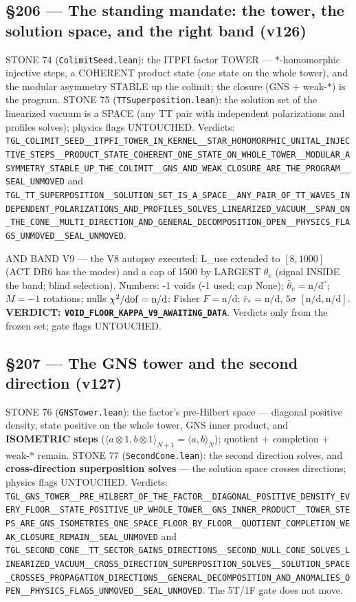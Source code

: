 \documentclass[11pt]{article}
\theoremstyle{definition}\newtheorem{deriv}{Derivation}
\begin{document}
\subsection*{\S206 --- The standing mandate: the tower, the solution space, and the right band (v126)}STONE 74 (\texttt{ColimitSeed.lean}): the ITPFI factor TOWER — *-homomorphic injective steps, a COHERENT product state (one state on the whole tower), and the modular asymmetry STABLE up the colimit; the closure (GNS $+$ weak-$*$) is the program. STONE 75 (\texttt{TTSuperposition.lean}): the solution set of the linearized vacuum is a SPACE (any TT pair with independent polarizations and profiles solves); physics flags UNTOUCHED. Verdicts: \texttt{TGL\_COLIMIT\_SEED\_\_ITPFI\_TOWER\_IN\_KERNEL\_\_STAR\_HOMOMORPHIC\_UNITAL\_INJECTIVE\_STEPS\_\_PRODUCT\_STATE\_COHERENT\_ONE\_STATE\_ON\_WHOLE\_TOWER\_\_MODULAR\_ASYMMETRY\_STABLE\_UP\_THE\_COLIMIT\_\_GNS\_AND\_WEAK\_CLOSURE\_ARE\_THE\_PROGRAM\_\_SEAL\_UNMOVED} and \texttt{TGL\_TT\_SUPERPOSITION\_\_SOLUTION\_SET\_IS\_A\_SPACE\_\_ANY\_PAIR\_OF\_TT\_WAVES\_INDEPENDENT\_POLARIZATIONS\_AND\_PROFILES\_SOLVES\_LINEARIZED\_VACUUM\_\_SPAN\_ON\_THE\_CONE\_\_MULTI\_DIRECTION\_AND\_GENERAL\_DECOMPOSITION\_OPEN\_\_PHYSICS\_FLAGS\_UNMOVED\_\_SEAL\_UNMOVED}.

AND BAND V9 — the V8 autopsy executed: L\_use extended to $[8,1000]$ (ACT DR6 has the modes) and a cap of 1500 by LARGEST $\theta_v$ (signal INSIDE the band; blind selection). Numbers: -1 voids (-1 used; cap None); $\bar\theta_v=\text{n/d}^{\circ}$; $M=-1$ rotations; nulls $\chi^2/{\rm dof}=\text{n/d}$; Fisher $F=\text{n/d}$; $\hat r_*=\text{n/d}$, $5\sigma$ $[\text{n/d},\text{n/d}]$. \textbf{VERDICT: \texttt{VOID\_FLOOR\_KAPPA\_V9\_AWAITING\_DATA}}. Verdicts only from the frozen set; gate flags UNTOUCHED.

\subsection*{\S207 --- The GNS tower and the second direction (v127)}STONE 76 (\texttt{GNSTower.lean}): the factor's pre-Hilbert space — diagonal positive density, state positive on the whole tower, GNS inner product, and \textbf{ISOMETRIC steps} ($\langle a\otimes1,b\otimes1\rangle_{N+1}=\langle a,b\rangle_N$); quotient $+$ completion $+$ weak-$*$ remain. STONE 77 (\texttt{SecondCone.lean}): the second direction solves, and \textbf{cross-direction superposition solves} — the solution space crosses directions; physics flags UNTOUCHED. Verdicts: \texttt{TGL\_GNS\_TOWER\_\_PRE\_HILBERT\_OF\_THE\_FACTOR\_\_DIAGONAL\_POSITIVE\_DENSITY\_EVERY\_FLOOR\_\_STATE\_POSITIVE\_UP\_WHOLE\_TOWER\_\_GNS\_INNER\_PRODUCT\_\_TOWER\_STEPS\_ARE\_GNS\_ISOMETRIES\_ONE\_SPACE\_FLOOR\_BY\_FLOOR\_\_QUOTIENT\_COMPLETION\_WEAK\_CLOSURE\_REMAIN\_\_SEAL\_UNMOVED} and \texttt{TGL\_SECOND\_CONE\_\_TT\_SECTOR\_GAINS\_DIRECTIONS\_\_SECOND\_NULL\_CONE\_SOLVES\_LINEARIZED\_VACUUM\_\_CROSS\_DIRECTION\_SUPERPOSITION\_SOLVES\_\_SOLUTION\_SPACE\_CROSSES\_PROPAGATION\_DIRECTIONS\_\_GENERAL\_DECOMPOSITION\_AND\_ANOMALIES\_OPEN\_\_PHYSICS\_FLAGS\_UNMOVED\_\_SEAL\_UNMOVED}. The 5T/1F gate does not move.
\end{document}
